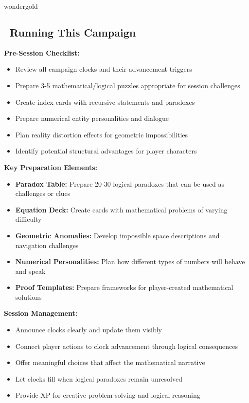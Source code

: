 \documentclass[11pt]{article}
\begin{document}
\begin{campaignsection}[GM Preparation]{wondergold}
\subsection*{\faDice\ Running This Campaign}

\textbf{Pre-Session Checklist:}
\begin{itemize}
    \item Review all campaign clocks and their advancement triggers
    \item Prepare 3-5 mathematical/logical puzzles appropriate for session challenges
    \item Create index cards with recursive statements and paradoxes
    \item Prepare numerical entity personalities and dialogue
    \item Plan reality distortion effects for geometric impossibilities
    \item Identify potential structural advantages for player characters
\end{itemize}

\textbf{Key Preparation Elements:}
\begin{itemize}
    \item \textbf{Paradox Table:} Prepare 20-30 logical paradoxes that can be used as challenges or clues
    \item \textbf{Equation Deck:} Create cards with mathematical problems of varying difficulty
    \item \textbf{Geometric Anomalies:} Develop impossible space descriptions and navigation challenges
    \item \textbf{Numerical Personalities:} Plan how different types of numbers will behave and speak
    \item \textbf{Proof Templates:} Prepare frameworks for player-created mathematical solutions
\end{itemize}

\textbf{Session Management:}
\begin{itemize}
    \item Announce clocks clearly and update them visibly
    \item Connect player actions to clock advancement through logical consequences
    \item Offer meaningful choices that affect the mathematical narrative
    \item Let clocks fill when logical paradoxes remain unresolved
    \item Provide XP for creative problem-solving and logical reasoning
\end{itemize}


\end{campaignsection}
\end{document}
